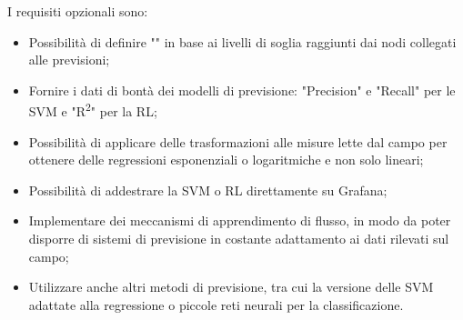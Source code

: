 \documentclass[../analisi-dei-requisiti.tex]{subfiles}
\begin{document}
	I requisiti opzionali sono:
	\begin{itemize}
		\item{Possibilità di definire "" in base ai livelli di soglia raggiunti dai nodi collegati alle previsioni;}
		\item{Fornire i dati di bontà dei modelli di previsione: "Precision" e "Recall" per le SVM e "R\textsuperscript{2}" per la RL;}
		\item{Possibilità di applicare delle trasformazioni alle misure lette dal campo per ottenere delle regressioni esponenziali o logaritmiche e non solo lineari;}
		\item{Possibilità di addestrare la SVM o RL direttamente su Grafana;}
		\item{Implementare dei meccanismi di apprendimento di flusso, in modo da poter disporre di sistemi di previsione in costante adattamento ai dati rilevati sul campo;}
		\item{Utilizzare anche altri metodi di previsione, tra cui la versione delle SVM adattate alla regressione o piccole reti neurali per la classificazione.}
	\end{itemize}
\end{document}
